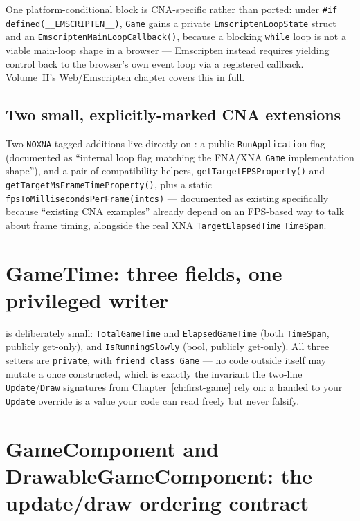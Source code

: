 One platform-conditional block is CNA-specific rather than ported: under
\texttt{\#if defined(\_\_EMSCRIPTEN\_\_)}, \texttt{Game} gains a private
\texttt{EmscriptenLoopState} struct and an \texttt{EmscriptenMainLoopCallback()}, because a
blocking \texttt{while} loop is not a viable main-loop shape in a browser --- Emscripten
instead requires yielding control back to the browser's own event loop via a registered
callback. Volume~II's Web/Emscripten chapter covers this in full.

\subsection{Two small, explicitly-marked CNA extensions}

Two \texttt{NOXNA}-tagged additions live directly on : a public
\texttt{RunApplication} flag (documented as ``internal loop flag matching the FNA/XNA
\texttt{Game} implementation shape''), and a pair of compatibility helpers,
\texttt{getTargetFPSProperty()} and \texttt{getTargetMsFrameTimeProperty()}, plus a static
\texttt{fpsToMillisecondsPerFrame(intcs)} --- documented as existing specifically because
``existing CNA examples'' already depend on an FPS-based way to talk about frame timing,
alongside the real XNA \texttt{TargetElapsedTime} \texttt{TimeSpan}.

\section{GameTime: three fields, one privileged writer}

 is deliberately small: \texttt{TotalGameTime} and
\texttt{ElapsedGameTime} (both \texttt{TimeSpan}, publicly get-only), and
\texttt{IsRunningSlowly} (bool, publicly get-only). All three setters are \texttt{private},
with \texttt{friend class Game} --- no code outside  itself may mutate a
 once constructed, which is exactly the invariant the two-line
\texttt{Update}/\texttt{Draw} signatures from Chapter~\ref{ch:first-game} rely on: a
 handed to your \texttt{Update} override is a value your code can read
freely but never falsify.

\section{GameComponent and DrawableGameComponent: the update/draw ordering contract}

